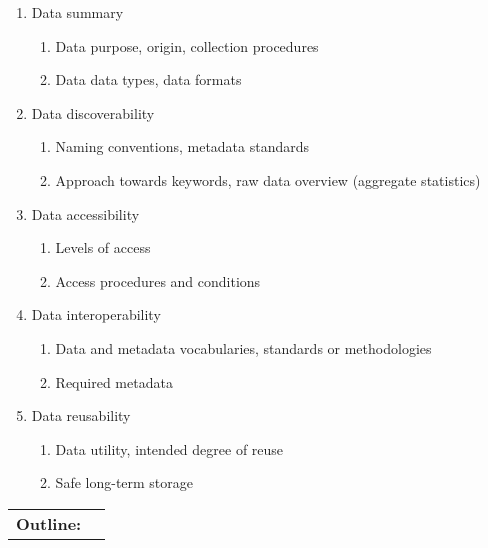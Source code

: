 \documentclass{article}
\begin{document}
\begin{enumerate}
  \item Data summary
      \begin{enumerate}
       \item Data purpose, origin, collection procedures
       \item Data data types, data formats
   \end{enumerate}
   \item Data discoverability
  \begin{enumerate}
  \item Naming conventions, metadata standards
  \item Approach towards keywords, raw data overview (aggregate statistics)
   \end{enumerate}
  \item Data accessibility
  \begin{enumerate}
  \item Levels of access
  \item Access procedures and conditions
  \end{enumerate}
   \item Data interoperability
  \begin{enumerate}
  \item Data and metadata vocabularies, standards or methodologies 
  \item Required metadata 
   \end{enumerate}
    \item Data reusability
      \begin{enumerate}
   \item Data utility, intended degree of reuse
  \item Safe long-term storage
  \end{enumerate} 
\end{enumerate}

\newpage

\begin{table}[h]
  \begin{tabular}{ll}
\textbf{Outline:}  &   \\ 
\end{tabular}
\end{table}
\end{document}
